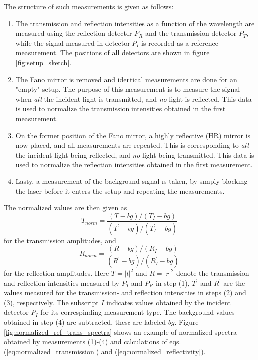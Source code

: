 The structure of such measurements is given as follows: 
\begin{enumerate}
    \item The transmission and reflection intensities as a function of the wavelength are measured using the reflection detector $P_R$ and the transmission detector $P_T$, while the signal measured in detector $P_I$ is recorded as a reference measurement. The positions of all detectors are shown in figure \ref{fig:setup_sketch}. 
    \item The Fano mirror is removed and identical measurements are done for an "empty" setup. The purpose of this measurement is to measure the signal when \emph{all} the incident light is transmitted, and \emph{no} light is reflected. This data is used to normalize the transmission intensities obtained in the first measurement. 
    \item On the former position of the Fano mirror, a highly reflective (HR) mirror is now placed, and all measurements are repeated. This is corresponding to \emph{all} the incident light being reflected, and \emph{no} light being transmitted. This data is used to normalize the reflection intensities obtained in the first measurement.
    \item Lasty, a measurement of the background signal is taken, by simply blocking the laser before it enters the setup and repeating the measurements. 
\end{enumerate}

The normalized values are then given as
\begin{equation}
    T_{norm} = \frac{(T-bg)/(T_I-bg)}{(T^{\prime}-bg)/(T_I^{\prime}-bg)}
    \label{eq:normalized_transmission}
\end{equation}
for the transmission amplitudes, and
\begin{equation}
    R_{norm} = \frac{(R-bg)/(R_I-bg)}{(R^{\prime}-bg)/(R_I^{\prime}-bg)}
    \label{eq:normalized_reflectivity}
\end{equation}
for the reflection amplitudes. Here $T=|t|^2$ and $R=|r|^2$ denote the transmission and reflection intensities measured by $P_T$ and $P_R$ in step (1), $T^{\prime}$ and $R^{\prime}$ are the values measured for the transmission- and reflection intensities in steps (2) and (3), respectively. The subscript $I$ indicates values obtained by the incident detector $P_I$ for its correspinding measurement type. The background values obtained in step (4) are subtracted, these are labeled $bg$. Figure \ref{fig:normalized_ref_trans_spectra} shows an example of normalized spectra obtained by measurements (1)-(4) and calculations of eqs. (\ref{eq:normalized_transmission}) and (\ref{eq:normalized_reflectivity}).

